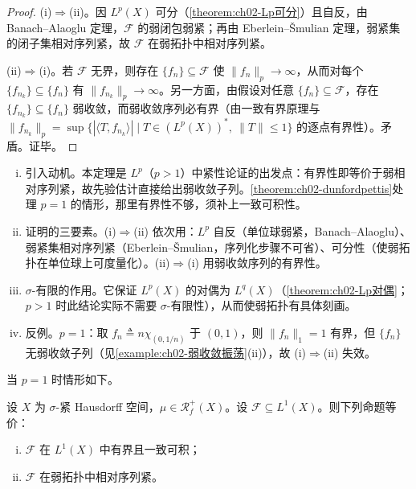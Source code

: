 \documentclass[../../main.tex]{subfiles}%
\begin{document}
\begin{proof}
(i)$\Rightarrow$(ii)。因 $L^p(X)$ 可分（\cref{theorem:ch02-Lp可分}）且自反，由 Banach--Alaoglu 定理，$\mathscr F$ 的弱闭包弱紧；再由 Eberlein--Šmulian 定理，弱紧集的闭子集相对序列紧，故 $\mathscr F$ 在弱拓扑中相对序列紧。

(ii)$\Rightarrow$(i)。若 $\mathscr F$ 无界，则存在 $\{f_n\}\subseteq\mathscr F$ 使 $\|f_n\|_p\to\infty$，从而对每个 $\{f_{n_k}\}\subseteq\{f_n\}$ 有 $\|f_{n_k}\|_p\to\infty$。另一方面，由假设对任意 $\{f_n\}\subseteq\mathscr F$，存在 $\{f_{n_k}\}\subseteq\{f_n\}$ 弱收敛，而弱收敛序列必有界（由一致有界原理与 $\|f_{n_k}\|_p=\sup\{|\langle T,f_{n_k}\rangle|\mid T\in(L^p(X))^*,\ \|T\|\leqslant1\}$ 的逐点有界性）。矛盾。证毕。
\end{proof}

\begin{remark}\label{remark:ch02-Lp弱紧}
\begin{enumerate}[(i)]
\item 引入动机。本定理是 $L^p$（$p>1$）中紧性论证的出发点：有界性即等价于弱相对序列紧，故先验估计直接给出弱收敛子列。\cref{theorem:ch02-dunfordpettis}处理 $p=1$ 的情形，那里有界性不够，须补上一致可积性。
\item 证明的三要素。(i)$\Rightarrow$(ii) 依次用：$L^p$ 自反（单位球弱紧，Banach--Alaoglu）、弱紧集相对序列紧（Eberlein--Šmulian，序列化步骤不可省）、可分性（使弱拓扑在单位球上可度量化）。(ii)$\Rightarrow$(i) 用弱收敛序列的有界性。
\item $\sigma$-有限的作用。它保证 $L^p(X)$ 的对偶为 $L^q(X)$（\cref{theorem:ch02-Lp对偶}；$p>1$ 时此结论实际不需要 $\sigma$-有限性），从而使弱拓扑有具体刻画。
\item 反例。$p=1$：取 $f_n\triangleq n\chi_{(0,1/n)}$ 于 $(0,1)$，则 $\|f_n\|_1=1$ 有界，但 $\{f_n\}$ 无弱收敛子列（见\cref{example:ch02-弱收敛振荡}(ii)），故 (i)$\Rightarrow$(ii) 失效。
\end{enumerate}
\end{remark}

当 $p=1$ 时情形如下。

\begin{theorem}\label{theorem:ch02-dunfordpettis}
设 $X$ 为 $\sigma$-紧 Hausdorff 空间，$\mu\in\mathscr R^+_f(X)$。设 $\mathscr F\subseteq L^1(X)$。则下列命题等价：
\begin{enumerate}[(i)]
\item $\mathscr F$ 在 $L^1(X)$ 中有界且一致可积；
\item $\mathscr F$ 在弱拓扑中相对序列紧。
\end{enumerate}
\end{theorem}
\end{document}
